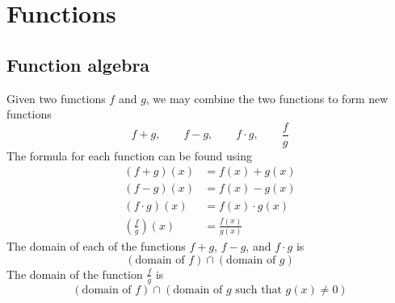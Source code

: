 \chapter{Functions}
\minitoc

\section{Function algebra}
\begin{pccdefinition}
Given two functions $f$ and $g$, we may combine the two functions to 
form new functions
\[
	f+g, \qquad f-g, \qquad f\cdot g, \qquad \frac{f}{g}
\]
The formula for each function can be found using
\begin{align*}
	(f+g)(x)                      & =f(x)+g(x)         \\ 
	(f-g)(x)                      & =f(x)-g(x)         \\ 
	(f\cdot g)(x)                 & =f(x)\cdot g(x)    \\ 
	\left( \frac{f}{g} \right)(x) & =\frac{f(x)}{g(x)} 
\end{align*}
The domain of each of the functions $f+g$, $f-g$, and $f\cdot g$ is
\[
	(\text{domain of }f)\cap (\text{domain of }g)
\]
The domain of the function $\frac{f}{g}$ is
\[
	(\text{domain of }f)\cap (\text{domain of }g \text{ such that }g(x)\ne 0)
\]
\end{pccdefinition}
